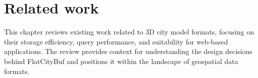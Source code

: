 \chapter{Related work}
\label{chap:related_work}
This chapter reviews existing work related to 3D city model formats, focusing on their storage efficiency, query performance, and suitability for web-based applications. The review provides context for understanding the design decisions behind FlatCityBuf and positions it within the landscape of geospatial data formats.
